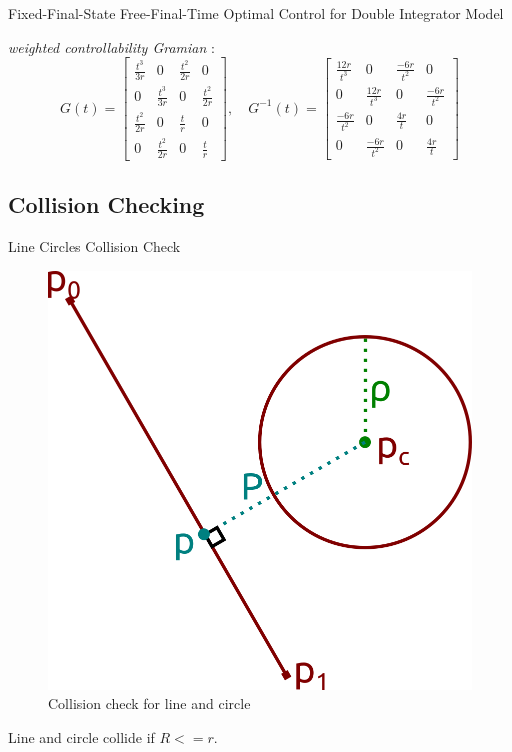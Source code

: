 \documentclass{beamer}
\begin{document}
\begin{frame}{Fixed-Final-State Free-Final-Time Optimal Control for Double Integrator Model}
{\begin{minipage}{1.2\textwidth}
\emph{weighted controllability Gramian} :
$$
G(t)=\begin{bmatrix}
\frac{t^{3}}{3r} & 0 & \frac{t^{2}}{2r} & 0 \\
0 & \frac{t^{3}}{3r} & 0 & \frac{t^{2}}{2r} \\
\frac{t^{2}}{2r} & 0 & \frac{t}{r} & 0\\
0 & \frac{t^{2}}{2r} & 0 & \frac{t}{r}
\end{bmatrix}
,\quad
G^{-1}(t) =\begin{bmatrix}
\frac{12r}{t^{3}} & 0 & \frac{-6r}{t^{2}} & 0 \\
0 & \frac{12r}{t^{3}} & 0 & \frac{-6r}{t^{2}} \\
\frac{-6r}{t^{2}} & 0 & \frac{4r}{t} & 0 \\
0 & \frac{-6r}{t^{2}} & 0 & \frac{4r}{t}
\end{bmatrix}
$$
\end{minipage}
}

\end{frame}

\subsection{Collision Checking}
\begin{frame}{Line Circles Collision Check}
\begin{figure}
	\centering 
	\includegraphics[width=0.35\linewidth]{assets/collision}
	\caption{Collision check for line and circle}
	\label{collision}
\end{figure}
\vskip 0.25cm
Line and circle collide if $R<=r$.
\vskip 0.25cm
\end{frame}
\end{document}
